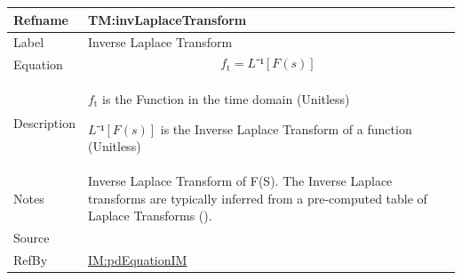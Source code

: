 \documentclass[12pt]{article}
\begin{document}
\medskip
\noindent
\begin{minipage}{\textwidth}
\begin{tabular}{>{\raggedright}p{}>{\raggedright\arraybackslash}p{}}
\toprule \textbf{Refname} & \textbf{TM:invLaplaceTransform}
\label{TM:invLaplaceTransform}
\\ \midrule
Label & Inverse Laplace Transform
        
\\ \midrule
Equation & \begin{displaymath}
           {f_{\text{t}}}=\mathit{L⁻¹[F(s)]}
           \end{displaymath}
\\ \midrule
Description & \begin{symbDescription}
              \item{${f_{\text{t}}}$ is the Function in the time domain (Unitless)}
              \item{$\mathit{L⁻¹[F(s)]}$ is the Inverse Laplace Transform of a function (Unitless)}
              \end{symbDescription}
\\ \midrule
Notes & Inverse Laplace Transform of F(S). The Inverse Laplace transforms are typically inferred from a pre-computed table of Laplace Transforms (\cite{laplaceWiki}).
        
\\ \midrule
Source & \cite{laplaceWiki}
         
\\ \midrule
RefBy & \hyperref[IM:pdEquationIM]{IM:pdEquationIM}
        
\\ \bottomrule
\end{tabular}
\end{minipage}
\end{document}
